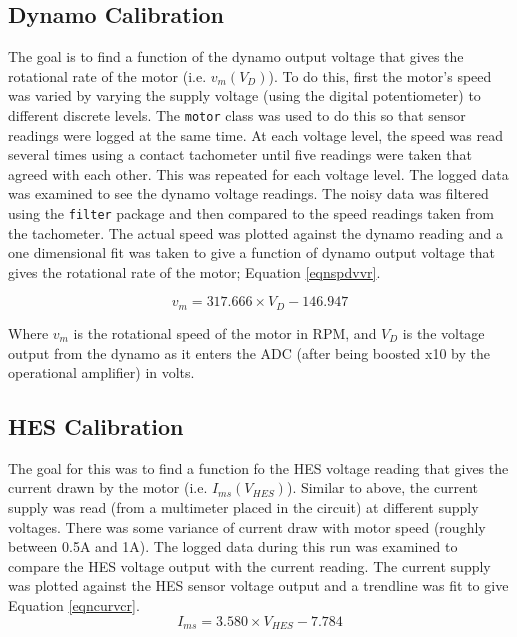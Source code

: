 \documentclass[twoside,a4]{report}
\begin{document}
	\subsection*{Dynamo Calibration}
	The goal is to find a function of the dynamo output voltage that gives the rotational rate of the motor (i.e. \(v_m ({V_D})\)). To do this, first the motor's speed was varied by varying the supply voltage (using the digital potentiometer) to different discrete levels. The \texttt{motor} class was used to do this so that sensor readings were logged at the same time. At each voltage level, the speed was read several times using a contact tachometer until five readings were taken that agreed with each other. This was repeated for each voltage level. The logged data was examined to see the dynamo voltage readings. The noisy data was filtered using the \texttt{filter} package and then compared to the speed readings taken from the tachometer. The actual speed was plotted against the dynamo reading and a one dimensional fit was taken to give a function of dynamo output voltage that gives the rotational rate of the motor; Equation \ref{eqnspdvvr}.
	
	\begin{equation}
	v_m = 317.666 \times {V_D} - 146.947
	\label{eqnspdvvr}
	\end{equation}
	
	
	\noindent
	Where \(v_m\) is the rotational speed of the motor in RPM, and \(V_D\) is the voltage output from the dynamo as it enters the ADC (after being boosted x10 by the operational amplifier) in volts.
	
	\subsection*{HES Calibration}
	The goal for this was to find a function fo the HES voltage reading that gives the current drawn by the motor (i.e. \(I_{ms} ({V_{HES}})\)). Similar to above, the current supply was read (from a multimeter placed in the circuit) at different supply voltages. There was some variance of current draw with motor speed (roughly between 0.5A and 1A). The logged data during this run was examined to compare the HES voltage output with the current reading. The current supply was plotted against the HES sensor voltage output and a trendline was fit to give Equation \ref{eqncurvcr}.
	\begin{equation}
	I_{ms} = 3.580 \times {V_{HES}} - 7.784
	\label{eqncurvcr}
	\end{equation}
	
\end{document}
